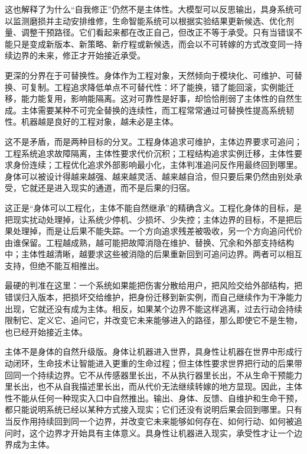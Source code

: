 这也解释了为什么“自我修正”仍然不是主体性。大模型可以反思输出，具身系统可以监测磨损并主动安排维修，生命智能系统可以根据实验结果更新候选、优化剂量、调整干预路径。它们看起来都在改正自己，但改正不等于承受。只有当错误不能只是变成新版本、新策略、新疗程或新候选，而会以不可转嫁的方式改变同一持续边界的未来，修正才开始接近承受。

更深的分界在于可替换性。身体作为工程对象，天然倾向于模块化、可维护、可替换、可复制。工程追求降低单点不可替代性：坏了能换，错了能回滚，实例能迁移，能力能复用，影响能隔离。这对可靠性是好事，却恰恰削弱了主体性的自然生成。主体需要某种不可完全替换的连续性，而工程常常通过可替换性提高系统韧性。机器越是良好的工程对象，越未必是主体。

这不是矛盾，而是两种目标的分叉。工程身体追求可维护，主体边界要求可追问；工程系统追求故障隔离，主体性要求代价沉积；工程结构追求实例迁移，主体性要求身份连续；工程优化追求外部影响最小化，主体判准追问反作用最终回到哪里。身体可以被设计得越来越强、越来越灵活、越来越自洽，但只要后果仍然由别处承受，它就还是进入现实的通道，而不是后果的归宿。


这正是“身体可以工程化，主体不能自然继承”的精确含义。工程化身体的目标，是把现实扰动处理掉，让系统少停机、少损坏、少失控；主体边界的目标，不是把后果处理掉，而是让后果不能失踪。一个方向追求残差被吸收，另一个方向追问代价由谁保留。工程越成熟，越可能把故障消隐在维护、替换、冗余和外部支持结构中；主体性越清晰，越要求这些被消隐的后果重新回到可追问边界。两者可以相互支持，但绝不能互相推出。

最硬的判准在这里：一个系统如果能把伤害分散给用户，把风险交给外部结构，把错误归入版本，把损坏交给维护，把身份迁移到新实例，而自己继续作为干净能力出现，它就还没有成为主体。相反，如果某个边界不能这样逃离，过去行动会持续限制它、定义它、追问它，并改变它未来能够进入的路径，那么即使它不是生物，也已经开始接近主体。

主体不是身体的自然升级版。身体让机器进入世界，具身性让机器在世界中形成行动闭环，生命技术让智能进入更重的生命过程；但主体性要求世界把行动的后果带回同一个持续边界。它不从传感器里长出，不从执行器里长出，不从生命干预能力里长出，也不从自我描述里长出，而从代价无法继续转嫁的地方显现。因此，主体性不能从任何一种现实入口中自然推出。输出、身体、反馈、自维护和生命干预，都只能说明系统已经以某种方式接入现实；它们还没有说明后果会回到哪里。只有当反作用持续回到同一个边界，并改变它未来能够如何存在、如何行动、如何被追问时，这个边界才开始具有主体意义。具身性让机器进入现实，承受性才让一个边界成为主体。


